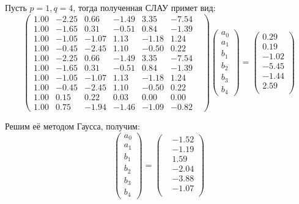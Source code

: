 \documentclass[a4paper, fontsize=14pt]{article}
\begin{document}
Пусть $p = 1, q = 4$, тогда полученная СЛАУ примет вид:
\begin{equation*}
    \begin{pmatrix}
        1.00 & -2.25 & 0.66  & -1.49 & 3.35  & -7.54 & \\
        1.00 & -1.65 & 0.31  & -0.51 & 0.84  & -1.39 & \\
        1.00 & -1.05 & -1.07 & 1.13  & -1.18 & 1.24  & \\
        1.00 & -0.45 & -2.45 & 1.10  & -0.50 & 0.22  & \\
        1.00 & -2.25 & 0.66  & -1.49 & 3.35  & -7.54 & \\
        1.00 & -1.65 & 0.31  & -0.51 & 0.84  & -1.39 & \\
        1.00 & -1.05 & -1.07 & 1.13  & -1.18 & 1.24  & \\
        1.00 & -0.45 & -2.45 & 1.10  & -0.50 & 0.22  & \\
        1.00 & 0.15  & 0.22  & 0.03  & 0.00  & 0.00  & \\
        1.00 & 0.75  & -1.94 & -1.46 & -1.09 & -0.82 &
    \end{pmatrix}
    \begin{pmatrix}
        a_0 \\
        a_1 \\
        b_1 \\
        b_2 \\
        b_3 \\
        b_4
    \end{pmatrix}
    =
    \begin{pmatrix}
        0.29 \\  0.19\\ -1.02\\ -5.45\\ -1.44\\  2.59\\
    \end{pmatrix}
\end{equation*}

Решим её методом Гаусса, получим:
\begin{equation*}
    \begin{pmatrix}
        a_0 \\
        a_1 \\
        b_1 \\
        b_2 \\
        b_3 \\
        b_4
    \end{pmatrix} =
    \begin{pmatrix}
         & -1.52 \\ &-1.19\\  &1.59\\ &-2.04\\ &-3.88\\ &-1.07\\
    \end{pmatrix}
\end{equation*}
\end{document}
